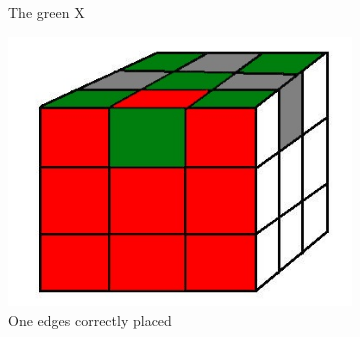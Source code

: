 \documentclass[a4paper,11pt]{kth-mag}
\begin{document}
\begin{figure}[bh]
\begin{subfigure}[!b]{0.3\textwidth}
		\caption{The green X}
		\label{fig_13}
	\end{subfigure}
	\begin{subfigure}[!b]{0.3\textwidth}
		\includegraphics[width=\textwidth]{figs/last-edge-correct.jpg}
		\caption{One edges correctly placed}
		\label{fig_14}
	\end{subfigure}
	\caption{}
\end{figure}
\end{document}
